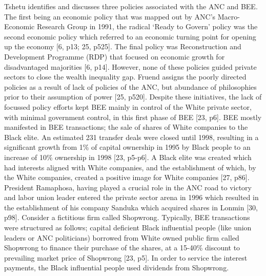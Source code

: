 Tshetu identifies and discusses three policies associated with the ANC and BEE. The first being an economic policy that was mapped out by ANC’s Macro-Economic Research Group in 1991, the radical ‘Ready to Govern’ policy was the second economic policy which referred to an economic turning point for opening up the economy [6, p13; 25, p525]. The final policy was Reconstruction and Development Programme (RDP) that focused on economic growth for disadvantaged majorities [6, p14]. However, none of these policies guided private sectors to close the wealth inequality gap. Fruend assigns the poorly directed policies as a result of lack of policies of the ANC, but abundance of philosophies prior to their assumption of power [25, p520].  Despite these initiatives, the lack of focussed policy efforts kept BEE mainly in control of the White private sector, with minimal government control, in this first phase of BEE [23, p6]. BEE mostly manifested in BEE transactions; the sale of shares of White companies to the Black elite. An estimated 231 transfer deals were closed until 1998, resulting in a significant growth from 1\% of capital ownership in 1995 by Black people to an increase of 10\% ownership in 1998 [23, p5-p6]. A Black elite was created which had interests aligned with White companies, and the establishment of which, by the White companies, created a positive image for White companies [27, p86]. President Ramaphosa, having played a crucial role in the ANC road to victory and labor union leader entered the private sector arena in 1996 which resulted in the establishment of his company Sanduka which acquired shares in Lonmin [30, p98]. Consider a fictitious firm called Shopwrong. Typically, BEE transactions were structured as follows; capital deficient Black influential people (like union leaders or ANC politicians) borrowed from White owned public firm called Shopwrong to finance their purchase of the shares, at a 15-40\% discount to prevailing market price of Shopwrong [23, p5]. In order to service the interest payments, the Black influential people used dividends from Shopwrong. 
